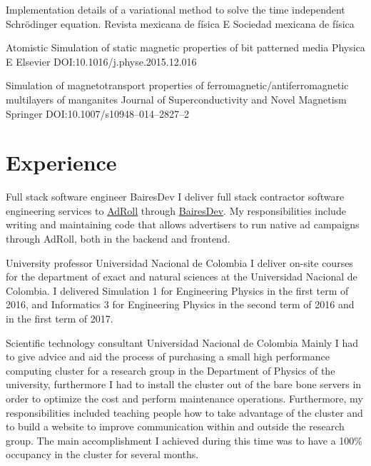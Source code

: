 \documentclass[12pt,english]{moderncv}
\begin{document}
        {%
            Implementation details of a variational method to solve the time
            independent Schrödinger equation.
        }
        {Revista mexicana de física E}
        {Sociedad mexicana de física}
        {}
        {}

        {Atomistic Simulation of static magnetic properties of bit patterned media}
        {Physica E}
        {Elsevier}
        {}
        {DOI:\@ 10.1016/j.physe.2015.12.016}

        {%
            Simulation of magnetotransport properties of
            ferromagnetic/antiferromagnetic multilayers of manganites
        }
        {Journal of Superconductivity and Novel Magnetism}
        {Springer}
        {}
        {DOI:\@ 10.1007/s10948--014--2827--2}


\section{Experience}

        {Full stack software engineer}
        {BairesDev}
        {}
        {}
        {%
            I deliver full stack contractor software engineering services to
            \href{https://www.adroll.com/}{AdRoll} through
            \href{http://www.bairesdev.com/}{BairesDev}. My responsibilities
            include writing and maintaining code that allows advertisers to run
            native ad campaigns through AdRoll, both in the backend and
            frontend.
        }

        {University professor}
        {Universidad Nacional de Colombia}
        {}
        {}
        {%
            I deliver on-site courses for the department of exact and natural
            sciences at the Universidad Nacional de Colombia. I delivered
            Simulation 1 for Engineering Physics in the first term of 2016, and
            Informatics 3 for Engineering Physics in the second term of 2016
            and in the first term of 2017.
        }

        {Scientific technology consultant}
        {Universidad Nacional de Colombia}
        {}
        {}
        {%
            Mainly I had to give advice and aid the process of purchasing a
            small high performance computing cluster for a research group in
            the Department of Physics of the university, furthermore I had to
            install the cluster out of the bare bone servers in order to
            optimize the cost and perform maintenance operations. Furthermore,
            my responsibilities included teaching people how to take advantage
            of the cluster and to build a website to improve communication
            within and outside the research group. The main accomplishment I
            achieved during this time was to have a 100\% occupancy in the
            cluster for several months.
        }
\end{document}
